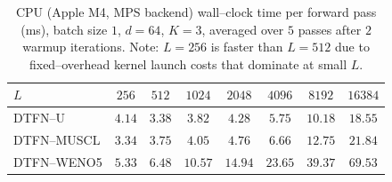 \documentclass[10pt]{article}
\theoremstyle{definition}
\theoremstyle{remark}
\begin{document}
\begin{table}[h]
  \centering
  \caption{CPU (Apple M4, MPS backend) wall--clock time per forward
    pass (ms), batch size $1$, $d = 64$, $K = 3$, averaged over $5$
    passes after $2$ warmup iterations.  Note: $L = 256$ is faster
    than $L = 512$ due to fixed--overhead kernel launch costs that
    dominate at small $L$.}
  \label{tab:cpu-scaling}
  \begin{tabular}{lccccccc}
    \toprule
    $L$ & $256$ & $512$ & $1024$ & $2048$ & $4096$ & $8192$ & $16384$ \\
    \midrule
    DTFN--U     & $4.14$ & $3.38$ & $3.82$ & $4.28$ & $5.75$  & $10.18$ & $18.55$ \\
    DTFN--MUSCL & $3.34$ & $3.75$ & $4.05$ & $4.76$ & $6.66$  & $12.75$ & $21.84$ \\
    DTFN--WENO5 & $5.33$ & $6.48$ & $10.57$ & $14.94$ & $23.65$ & $39.37$ & $69.53$ \\
    \bottomrule
  \end{tabular}
\end{table}
\end{document}
